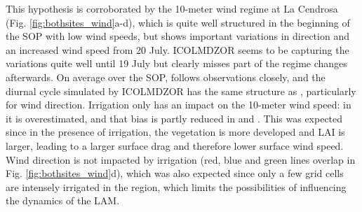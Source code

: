 This hypothesis is corroborated by the 10-meter wind regime at La Cendrosa (Fig. \ref{fig:bothsites_wind}a-d), which is quite well structured in the beginning of the SOP with low wind speeds, but shows important variations in direction and an increased wind speed from 20 July. ICOLMDZOR seems to be capturing the variations quite well until 19 July but clearly misses part of the regime changes afterwards. 
On average over the SOP, \mesoexact follows observations closely, and the diurnal cycle simulated by ICOLMDZOR has the same structure as \mesomean, particularly for wind direction.
Irrigation only has an impact on the 10-meter wind speed: in \noirr it is overestimated, and that bias is partly reduced in \irr and \irrboost. This was expected since in the presence of irrigation, the vegetation is more developed and LAI is larger, leading to a larger surface drag and therefore lower surface wind speed. 
Wind direction is not impacted by irrigation (red, blue and green lines overlap in Fig. \ref{fig:bothsites_wind}d), which was also expected since only a few grid cells are intensely irrigated in the region, which limits the possibilities of influencing the dynamics of the LAM.

